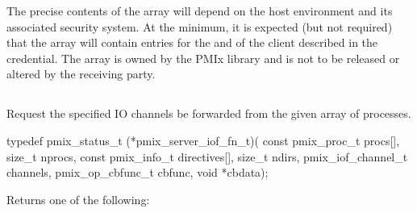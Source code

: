 \adviceuserstart
The precise contents of the array will depend on the host environment and its associated security system. At the minimum, it is expected (but not required) that the array will contain entries for the  and  of the client described in the credential. The  array is owned by the \ac{PMIx} library and is not to be released or altered by the receiving party.
\adviceuserend


\subsection{}

\summary

Request the specified IO channels be forwarded from the given array of processes.

\format

\cspecificstart
\begin{codepar}
typedef pmix_status_t (*pmix_server_iof_fn_t)(
                        const pmix_proc_t procs[], size_t nprocs,
                        const pmix_info_t directives[], size_t ndirs,
                        pmix_iof_channel_t channels,
                        pmix_op_cbfunc_t cbfunc, void *cbdata);
\end{codepar}
\cspecificend

\begin{arglist}
\end{arglist}

Returns one of the following:

